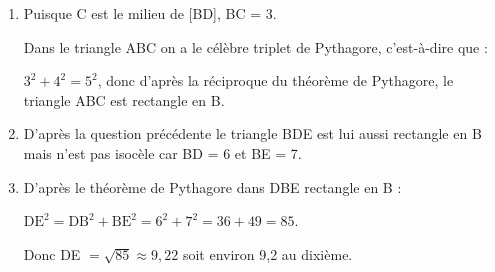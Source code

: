 
\bigskip

% 
\begin{enumerate}
\item Puisque C est le milieu de [BD], BC = 3.

Dans le triangle ABC on a le célèbre triplet de Pythagore, c'est-à-dire que :

$3^2 + 4^2 = 5^2$, donc d'après la réciproque du théorème de Pythagore, le triangle ABC est rectangle en B.
\item D'après la question précédente le triangle BDE est lui aussi rectangle en B mais n'est pas isocèle car BD = 6 et BE = 7.
\item D'après le théorème de Pythagore dans DBE rectangle en B :

$\text{DE}^2 = \text{DB}^2 + \text{BE}^2 = 6^2 + 7^2 = 36 + 49 = 85$.

Donc DE $ = \sqrt{85} \approx 9,22$ soit environ 9,2 au dixième.
\end{enumerate}

\bigskip 

